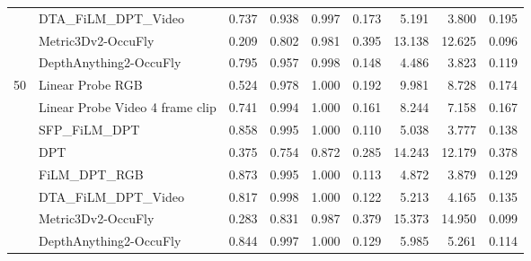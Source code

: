 \begin{table}[!htbp]
{\begin{tabular}{llrrrrrrr}
 & DTA\_FiLM\_DPT\_Video & 0.737 & 0.938 & 0.997 & 0.173 & 5.191 & 3.800 & 0.195 \\
\cmidrule(lr){2-9}
 & Metric3Dv2-OccuFly~\cite{gross2026occufly} & 0.209 & 0.802 & 0.981 & 0.395 & 13.138 & 12.625 & 0.096 \\
 & DepthAnything2-OccuFly~\cite{gross2026occufly} & 0.795 & 0.957 & 0.998 & 0.148 & \cellcolor{bestmiou}4.486 & 3.823 & 0.119 \\
\midrule
50 & Linear Probe RGB & 0.524 & 0.978 & 1.000 & 0.192 & 9.981 & 8.728 & 0.174 \\
 & Linear Probe Video 4 frame clip & 0.741 & 0.994 & 1.000 & 0.161 & 8.244 & 7.158 & 0.167 \\
 & SFP\_FiLM\_DPT & 0.858 & 0.995 & 1.000 & 0.110 & 5.038 & 3.777 & 0.138 \\
 & DPT & 0.375 & 0.754 & 0.872 & 0.285 & 14.243 & 12.179 & 0.378 \\
 & FiLM\_DPT\_RGB & 0.873 & 0.995 & 1.000 & 0.113 & \cellcolor{bestmiou}4.872 & 3.879 & 0.129 \\
 & DTA\_FiLM\_DPT\_Video & 0.817 & 0.998 & 1.000 & 0.122 & 5.213 & 4.165 & 0.135 \\
\cmidrule(lr){2-9}
 & Metric3Dv2-OccuFly~\cite{gross2026occufly} & 0.283 & 0.831 & 0.987 & 0.379 & 15.373 & 14.950 & 0.099 \\
 & DepthAnything2-OccuFly~\cite{gross2026occufly} & 0.844 & 0.997 & 1.000 & 0.129 & 5.985 & 5.261 & 0.114 \\
\bottomrule
\end{tabular}%
}
\end{table}

